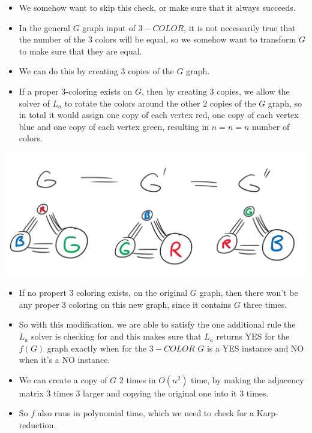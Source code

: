 \begin{itemize}
    \item We somehow want to skip this check, or make sure that it always succeeds.
    \item In the general $G$ graph input of $3-COLOR$, it is not necessarily true that the number of the $3$ colors will be equal, so we somehow want to transform $G$ to make sure that they are equal.
    \item We can do this by creating $3$ copies of the $G$ graph.
    \item If a proper $3$-coloring exists on $G$, then by creating $3$ copies, we allow the solver of $L_a$ to rotate the colors around the other $2$ copies of the $G$ graph, so in total it would assign one copy of each vertex red, one copy of each vertex blue and one copy of each vertex green, resulting in $n=n=n$ number of colors.
\end{itemize}

\begin{center}
    \includegraphics[width=\linewidth]{09/01/3_color_equal.png}
\end{center}

\begin{itemize}
    \item If no propert $3$ coloring exists, on the original $G$ graph, then there won't be any proper $3$ coloring on this new graph, since it contains $G$ three times.
    \item So with this modification, we are able to satisfy the one additional rule the $L_a$ solver is checking for and this makes sure that $L_a$ returns YES for the $f(G)$ graph exactly when for the $3-COLOR$ $G$ is a YES instance and NO when it's a NO instance.
    \item We can create a copy of $G$ 2 times in $O(n^2)$ time, by making the adjacency matrix $3$ times $3$ larger and copying the original one into it $3$ times.
    \item So $f$ also runs in polynomial time, which we need to check for a Karp-reduction.
\end{itemize}

